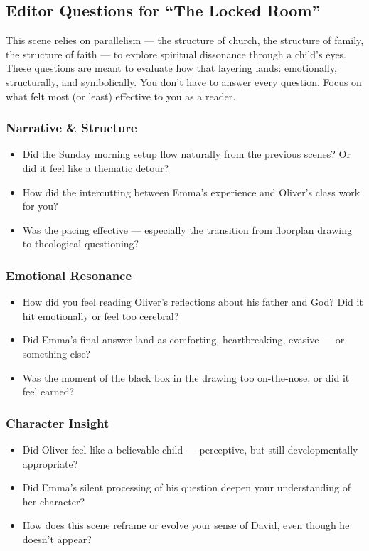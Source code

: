 \subsection*{Editor Questions for ``The Locked Room''}

This scene relies on parallelism — the structure of church, the structure of family, the structure of faith — to explore spiritual dissonance through a child’s eyes. These questions are meant to evaluate how that layering lands: emotionally, structurally, and symbolically. You don’t have to answer every question. Focus on what felt most (or least) effective to you as a reader.

\subsubsection*{Narrative \& Structure}

\begin{itemize}
  \item Did the Sunday morning setup flow naturally from the previous scenes? Or did it feel like a thematic detour?
  \item How did the intercutting between Emma’s experience and Oliver’s class work for you?
  \item Was the pacing effective — especially the transition from floorplan drawing to theological questioning?
\end{itemize}

\subsubsection*{Emotional Resonance}

\begin{itemize}
  \item How did you feel reading Oliver’s reflections about his father and God? Did it hit emotionally or feel too cerebral?
  \item Did Emma’s final answer land as comforting, heartbreaking, evasive — or something else?
  \item Was the moment of the black box in the drawing too on-the-nose, or did it feel earned?
\end{itemize}

\subsubsection*{Character Insight}

\begin{itemize}
  \item Did Oliver feel like a believable child — perceptive, but still developmentally appropriate?
  \item Did Emma’s silent processing of his question deepen your understanding of her character?
  \item How does this scene reframe or evolve your sense of David, even though he doesn’t appear?
\end{itemize}

